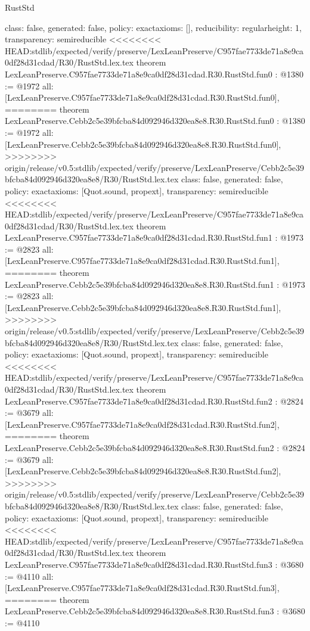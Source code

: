 \begin{lexlean}{RustStd}
\begin{coremodule}
{\begin{coremodule}
{{{  class: false,
  generated: false,
  policy: exact{axioms: []},
  reducibility: regular{height: 1},
  transparency: semireducible
}
<<<<<<<< HEAD:stdlib/expected/verify/preserve/LexLeanPreserve/C957fae7733de71a8e9ca0df28d31cdad/R30/RustStd.lex.tex
theorem LexLeanPreserve.C957fae7733de71a8e9ca0df28d31cdad.R30.RustStd.fun0 : @1380 := @1972 {
  all: [LexLeanPreserve.C957fae7733de71a8e9ca0df28d31cdad.R30.RustStd.fun0],
========
theorem LexLeanPreserve.Cebb2c5e39bfcba84d092946d320ea8e8.R30.RustStd.fun0 : @1380 := @1972 {
  all: [LexLeanPreserve.Cebb2c5e39bfcba84d092946d320ea8e8.R30.RustStd.fun0],
>>>>>>>> origin/release/v0.5:stdlib/expected/verify/preserve/LexLeanPreserve/Cebb2c5e39bfcba84d092946d320ea8e8/R30/RustStd.lex.tex
  class: false,
  generated: false,
  policy: exact{axioms: [Quot.sound, propext]},
  transparency: semireducible
}
<<<<<<<< HEAD:stdlib/expected/verify/preserve/LexLeanPreserve/C957fae7733de71a8e9ca0df28d31cdad/R30/RustStd.lex.tex
theorem LexLeanPreserve.C957fae7733de71a8e9ca0df28d31cdad.R30.RustStd.fun1 : @1973 := @2823 {
  all: [LexLeanPreserve.C957fae7733de71a8e9ca0df28d31cdad.R30.RustStd.fun1],
========
theorem LexLeanPreserve.Cebb2c5e39bfcba84d092946d320ea8e8.R30.RustStd.fun1 : @1973 := @2823 {
  all: [LexLeanPreserve.Cebb2c5e39bfcba84d092946d320ea8e8.R30.RustStd.fun1],
>>>>>>>> origin/release/v0.5:stdlib/expected/verify/preserve/LexLeanPreserve/Cebb2c5e39bfcba84d092946d320ea8e8/R30/RustStd.lex.tex
  class: false,
  generated: false,
  policy: exact{axioms: [Quot.sound, propext]},
  transparency: semireducible
}
<<<<<<<< HEAD:stdlib/expected/verify/preserve/LexLeanPreserve/C957fae7733de71a8e9ca0df28d31cdad/R30/RustStd.lex.tex
theorem LexLeanPreserve.C957fae7733de71a8e9ca0df28d31cdad.R30.RustStd.fun2 : @2824 := @3679 {
  all: [LexLeanPreserve.C957fae7733de71a8e9ca0df28d31cdad.R30.RustStd.fun2],
========
theorem LexLeanPreserve.Cebb2c5e39bfcba84d092946d320ea8e8.R30.RustStd.fun2 : @2824 := @3679 {
  all: [LexLeanPreserve.Cebb2c5e39bfcba84d092946d320ea8e8.R30.RustStd.fun2],
>>>>>>>> origin/release/v0.5:stdlib/expected/verify/preserve/LexLeanPreserve/Cebb2c5e39bfcba84d092946d320ea8e8/R30/RustStd.lex.tex
  class: false,
  generated: false,
  policy: exact{axioms: [Quot.sound, propext]},
  transparency: semireducible
}
<<<<<<<< HEAD:stdlib/expected/verify/preserve/LexLeanPreserve/C957fae7733de71a8e9ca0df28d31cdad/R30/RustStd.lex.tex
theorem LexLeanPreserve.C957fae7733de71a8e9ca0df28d31cdad.R30.RustStd.fun3 : @3680 := @4110 {
  all: [LexLeanPreserve.C957fae7733de71a8e9ca0df28d31cdad.R30.RustStd.fun3],
========
theorem LexLeanPreserve.Cebb2c5e39bfcba84d092946d320ea8e8.R30.RustStd.fun3 : @3680 := @4110 {
}}}}}}}
\end{coremodule}}
\end{coremodule}
\end{lexlean}
